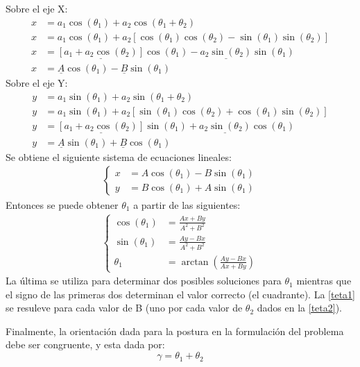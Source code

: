 \documentclass[a4paper,12pt]{article}
\begin{document}
Sobre el eje X:
\begin{align*}
    x &= a_1\cos(\theta_1) + a_2\cos(\theta_1 + \theta_2)\\
    x &= a_1\cos(\theta_1) + a_2\left[\cos(\theta_1)\cos(\theta_2) - \sin(\theta_1)\sin(\theta_2)\right]\\
    x &= \underline{\left[a_1 + a_2\cos(\theta_2)\right]}\cos(\theta_1) - \underline{a_2\sin(\theta_2)}\sin(\theta_1)\\
    x &= \underline{A}\cos(\theta_1) - \underline{B}\sin(\theta_1)
\end{align*}
Sobre el eje Y:
\begin{align*}
    y &= a_1\sin(\theta_1) + a_2\sin(\theta_1 + \theta_2)\\
    y &= a_1\sin(\theta_1) + a_2\left[\sin(\theta_1)\cos(\theta_2) + \cos(\theta_1)\sin(\theta_2)\right]\\
    y &= \underline{\left[a_1 + a_2\cos(\theta_2)\right]}\sin(\theta_1) + \underline{a_2\sin(\theta_2)}\cos(\theta_1)\\
    y &= \underline{A}\sin(\theta_1) + \underline{B}\cos(\theta_1)
\end{align*}
Se obtiene el siguiente sistema de ecuaciones lineales:
\begin{align*}
    \begin{cases}
        x &= A\cos(\theta_1) - B\sin(\theta_1)\\
        y &= B\cos(\theta_1) + A\sin(\theta_1)
    \end{cases}
\end{align*}
Entonces se puede obtener $\theta_1$ a partir de las siguientes:
\begin{align}
    \begin{cases}
        \cos(\theta_1) &= \frac{Ax + By}{A^2 + B^2}\\
        \sin(\theta_1) &= \frac{Ay - Bx}{A^2 + B^2}\\
        \theta_1 &= \arctan{\left(\frac{Ay - Bx}{Ax + By}\right)}
    \end{cases}
    \label{teta1}
\end{align}
La última se utiliza para determinar dos posibles soluciones para $\theta_1$ mientras que el signo de las primeras dos determinan el valor correcto (el cuadrante).
La \cref{teta1} se resuleve para cada valor de B (uno por cada valor de $\theta_2$ dados en la \cref{teta2}).

Finalmente, la orientación dada para la postura en la formulación del problema debe ser congruente, y esta dada por:
\[\gamma = \theta_1 + \theta_2\]
\end{document}

